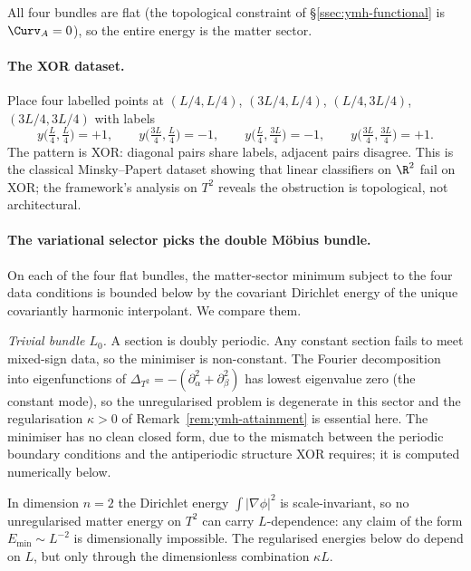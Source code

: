 All four bundles are flat (the topological constraint of
\S\ref{ssec:ymh-functional} is $\Curv_A=0$), so the entire energy
is the matter sector.

\paragraph{The XOR dataset.} Place four labelled points at
$(L/4,L/4)$, $(3L/4,L/4)$, $(L/4,3L/4)$, $(3L/4,3L/4)$ with labels
\[
   y\bigl(\tfrac{L}{4},\tfrac{L}{4}\bigr) = +1,\qquad
   y\bigl(\tfrac{3L}{4},\tfrac{L}{4}\bigr) = -1,\qquad
   y\bigl(\tfrac{L}{4},\tfrac{3L}{4}\bigr) = -1,\qquad
   y\bigl(\tfrac{3L}{4},\tfrac{3L}{4}\bigr) = +1.
\]
The pattern is XOR: diagonal pairs share labels, adjacent pairs
disagree. This is the classical Minsky--Papert dataset showing that
linear classifiers on $\R^2$ fail on XOR; the framework's analysis
on $T^2$ reveals the obstruction is topological, not architectural.

\paragraph{The variational selector picks the double M\"obius
bundle.} On each of the four flat bundles, the matter-sector
minimum subject to the four data conditions is bounded below by the
covariant Dirichlet energy of the unique covariantly harmonic
interpolant. We compare them.

\emph{Trivial bundle $L_0$.} A section is doubly periodic. Any
constant section fails to meet mixed-sign data, so the minimiser is
non-constant. The Fourier decomposition into eigenfunctions of
$\Delta_{T^2}=-(\partial_\alpha^2+\partial_\beta^2)$ has lowest
eigenvalue zero (the constant mode), so the unregularised problem is
degenerate in this sector and the regularisation $\kappa>0$ of
Remark~\ref{rem:ymh-attainment} is essential here. The minimiser has
no clean closed form, due to the mismatch between the periodic
boundary conditions and the antiperiodic structure XOR requires; it
is computed numerically below.

\begin{remark}
\label{rem:t2-scale}
In dimension $n=2$ the Dirichlet energy $\int|\nabla\phi|^2$ is
scale-invariant, so no unregularised matter energy on $T^2$ can carry
$L$-dependence: any claim of the form $E_{\min}\sim L^{-2}$ is
dimensionally impossible. The regularised energies below do depend
on $L$, but only through the dimensionless combination $\kappa L$.
\end{remark}

